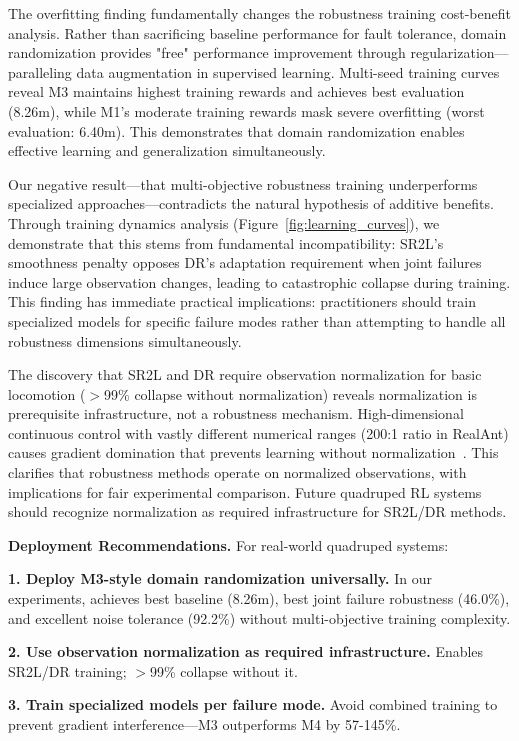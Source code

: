 \documentclass[conference]{IEEEtran}
\begin{document}
The overfitting finding fundamentally changes the robustness training cost-benefit analysis. Rather than sacrificing baseline performance for fault tolerance, domain randomization provides "free" performance improvement through regularization—paralleling data augmentation in supervised learning. Multi-seed training curves reveal M3 maintains highest training rewards and achieves best evaluation (8.26m), while M1's moderate training rewards mask severe overfitting (worst evaluation: 6.40m). This demonstrates that domain randomization enables effective learning and generalization simultaneously.

Our negative result—that multi-objective robustness training underperforms specialized approaches—contradicts the natural hypothesis of additive benefits. Through training dynamics analysis (Figure~\ref{fig:learning_curves}), we demonstrate that this stems from fundamental incompatibility: SR2L's smoothness penalty opposes DR's adaptation requirement when joint failures induce large observation changes, leading to catastrophic collapse during training. This finding has immediate practical implications: practitioners should train specialized models for specific failure modes rather than attempting to handle all robustness dimensions simultaneously.

The discovery that SR2L and DR require observation normalization for basic locomotion ($>$99\% collapse without normalization) reveals normalization is prerequisite infrastructure, not a robustness mechanism. High-dimensional continuous control with vastly different numerical ranges (200:1 ratio in RealAnt) causes gradient domination that prevents learning without normalization~\cite{huang2022ppo}. This clarifies that robustness methods operate on normalized observations, with implications for fair experimental comparison. Future quadruped RL systems should recognize normalization as required infrastructure for SR2L/DR methods.

\textbf{Deployment Recommendations.} For real-world quadruped systems:

\textbf{1. Deploy M3-style domain randomization universally.} In our experiments, achieves best baseline (8.26m), best joint failure robustness (46.0\%), and excellent noise tolerance (92.2\%) without multi-objective training complexity.

\textbf{2. Use observation normalization as required infrastructure.} Enables SR2L/DR training; $>$99\% collapse without it.

\textbf{3. Train specialized models per failure mode.} Avoid combined training to prevent gradient interference—M3 outperforms M4 by 57-145\%.
\end{document}
